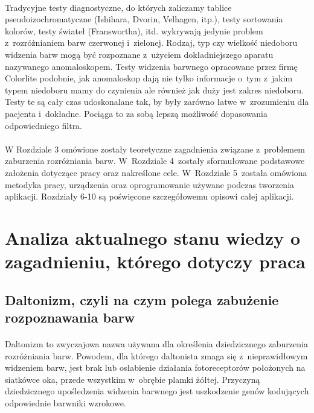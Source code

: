 \documentclass[12pt, letterpaper]{article}
\begin{document}
\paragraph{}
Tradycyjne testy diagnostyczne, do których zaliczamy tablice pseudoizochromatyczne (Ishihara, Dvorin, Velhagen, itp.), testy sortowania kolorów, testy świateł (Franswortha), itd. wykrywają jedynie problem z~rozróżnianiem barw czerwonej i~zielonej. Rodzaj, typ czy wielkość niedoboru widzenia barw mogą być rozpoznane z~użyciem dokładniejszego aparatu nazywanego anomaloskopem. Testy widzenia barwnego opracowane przez firmę Colorlite podobnie, jak anomaloskop dają nie tylko informacje o~tym z~jakim typem niedoboru mamy do czynienia ale również jak duży jest zakres niedoboru. Testy te są cały czas udoskonalane tak, by były zarówno łatwe w~zrozumieniu dla pacjenta i~dokładne. Pociąga to za sobą lepszą możliwość dopasowania odpowiedniego filtra.

\paragraph{}
W Rozdziale 3 omówione zostały teoretyczne zagadnienia związane z~problemem zaburzenia rozróżniania barw. W~Rozdziale 4~zostały sformułowane podstawowe założenia dotyczące pracy oraz nakreślone cele. W~Rozdziale 5~została omówiona metodyka pracy, urządzenia oraz oprogramowanie używane podczas tworzenia aplikacji. Rozdziały 6-10 są poświęcone szczegółowemu opisowi całej aplikacji.

\newpage
\section{Analiza aktualnego stanu wiedzy o zagadnieniu, którego dotyczy praca}
\subsection{Daltonizm, czyli na czym polega zabużenie rozpoznawania barw}
\paragraph{}
Daltonizm to zwyczajowa nazwa używana dla określenia dziedzicznego zaburzenia rozróżniania barw. Powodem, dla którego daltonista zmaga się z~nieprawidłowym widzeniem barw, jest brak lub osłabienie działania fotoreceptorów położonych na siatkówce oka, przede wszystkim w~obrębie plamki żółtej. Przyczyną dziedzicznego upośledzenia widzenia barwnego jest uszkodzenie genów kodujących odpowiednie barwniki wzrokowe.
\end{document}
